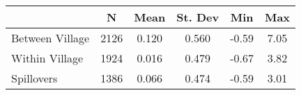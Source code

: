 \begin{tabular}{l*{5}{c}}\hline&\multicolumn{1}{c}{N}&\multicolumn{1}{c}{Mean}&\multicolumn{1}{c}{St. Dev}&\multicolumn{1}{c}{Min}&\multicolumn{1}{c}{Max}\\ \hline 
Between Village & 2126 & 0.120 & 0.560 & -0.59 & 7.05 \\
Within Village & 1924 & 0.016 & 0.479 & -0.67 & 3.82 \\
Spillovers & 1386 & 0.066 & 0.474 & -0.59 & 3.01 \\
\hline \end{tabular}
